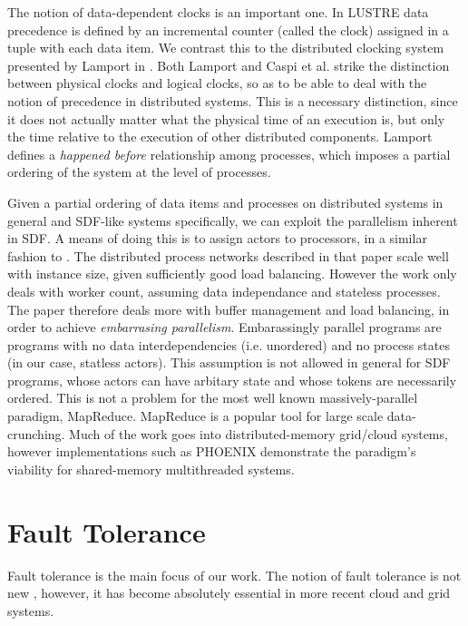 The notion of data-dependent clocks is an important one.
In LUSTRE data precedence is defined by an incremental counter (called the clock) assigned in a tuple with each data item.
We contrast this to the distributed clocking system presented by Lamport in \cite{lam78}.
Both Lamport and Caspi et al. strike the distinction between physical clocks and logical clocks, so as to be able to deal with the notion of precedence in distributed systems.
This is a necessary distinction, since it does not actually matter what the physical time of an execution is, but only the time relative to the execution of other distributed components.
Lamport defines a {\em happened before} relationship among processes, which imposes a partial ordering of the system at the level of processes.

Given a partial ordering of data items and processes on distributed systems in general and SDF-like systems specifically, we can exploit the parallelism inherent in SDF.
A means of doing this is to assign actors to processors, in a similar fashion to \cite{par03}.
The distributed process networks described in that paper scale well with instance size, given sufficiently good load balancing.
However the work only deals with worker count, assuming data independance and stateless processes.
The paper therefore deals more with buffer management and load balancing, in order to achieve {\em embarrasing parallelism}.
Embarassingly parallel programs are programs with no data interdependencies (i.e. unordered) and no process states (in our case, statless actors).
This assumption is not allowed in general for SDF programs, whose actors can have arbitary state and whose tokens are necessarily ordered.
This is not a problem for the most well known massively-parallel paradigm, MapReduce.
MapReduce \cite{dea08} is a popular tool for large scale data-crunching.
Much of the work goes into distributed-memory grid/cloud systems, however implementations such as PHOENIX \cite{ran07} demonstrate the paradigm's viability for shared-memory multithreaded systems.

\section{Fault Tolerance}

Fault tolerance is the main focus of our work.
The notion of fault tolerance is not new \cite{ran75}, however, it has become absolutely essential in more recent cloud and grid systems.

